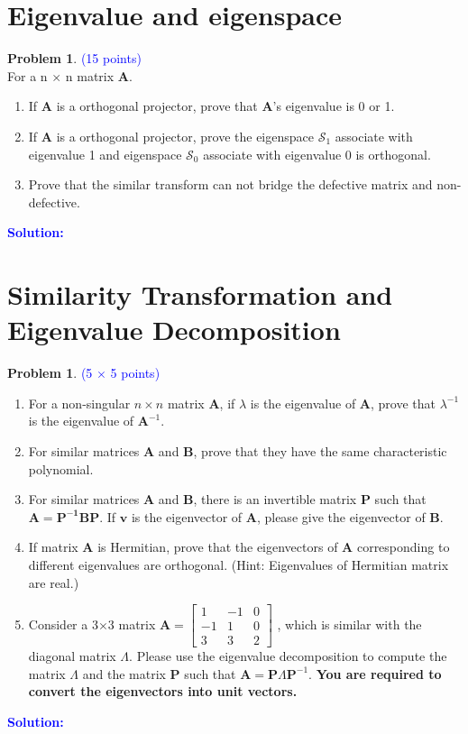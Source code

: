 \documentclass[english,onecolumn]{IEEEtran}
\begin{document}
\section{Eigenvalue and eigenspace\textbf{}}
\noindent\textbf{Problem 1}. \textcolor{blue}{(15 points)}\\
For a n $\times$ n matrix $\mathbf{A}$.
\begin{enumerate}
\item If $\mathbf{A}$ is a orthogonal projector, prove that $\mathbf{A}$'s eigenvalue is 0 or 1.
\item If $\mathbf{A}$ is a orthogonal projector, prove the eigenspace $\mathcal{S}_{1}$ associate with eigenvalue 1 and eigenspace $\mathcal{S}_{0}$ associate with eigenvalue 0 is orthogonal.
\item Prove that the similar transform can not bridge the defective matrix and non-defective.

\end{enumerate}
\noindent\textcolor{blue}{
	\textbf{Solution:}
}
\newpage

\section{Similarity Transformation and Eigenvalue Decomposition}

\noindent\textbf{Problem 1}. \textcolor{blue}{(5 $\times$ 5 points)}
\begin{enumerate}
	\item For a non-singular $n\times n$ matrix $\mathbf{A}$, if $\lambda$ is the eigenvalue of $\mathbf{A}$, prove that $\lambda^{-1}$ is the eigenvalue of $\mathbf{A}^{-1}$.
	\item For similar matrices $\mathbf{A}$ and $\mathbf{B}$, prove that they have the same characteristic polynomial.
	\item For similar matrices $\mathbf{A}$ and $\mathbf{B}$, there is an invertible matrix $\mathbf{P}$ such that $\mathbf{A}=\mathbf{P^{-1}BP}$. If $\mathbf{v}$ is the eigenvector of $\mathbf{A}$, please give the eigenvector of $\mathbf{B}$.
	\item If matrix $\mathbf{A}$ is Hermitian, prove that the eigenvectors of $\mathbf{A}$ corresponding to different eigenvalues are orthogonal. (Hint: Eigenvalues of Hermitian matrix are real.)
 	\item Consider a 3$\times$3 matrix $\mathbf{A} = \begin{bmatrix}
 1 & -1 & 0\\ 
 -1 & 1 & 0\\ 
 3 & 3 & 2
\end{bmatrix}$ , which is similar with the diagonal matrix $\Lambda$. Please use the eigenvalue decomposition to compute the matrix $\Lambda$ and the matrix $\mathbf{P}$ such that $\mathbf{A}=\mathbf{P}\Lambda\mathbf{P}^{-1}$. \textbf{You are required to convert the eigenvectors into unit vectors.}
\end{enumerate}
\noindent\textcolor{blue}{
	\textbf{Solution:}
}
\newpage
\end{document}
